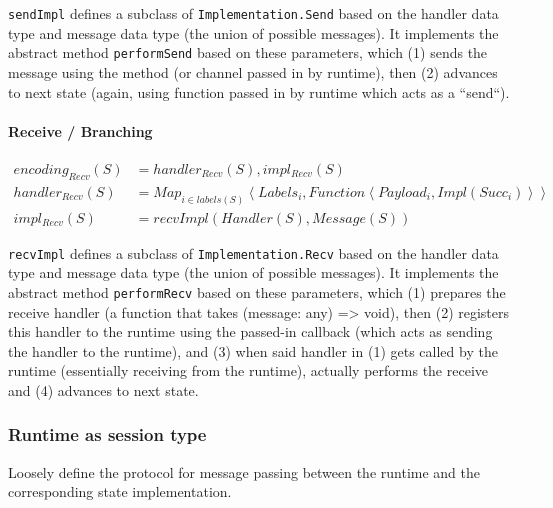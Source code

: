 \documentclass{article}
\begin{document}
\texttt{sendImpl} defines a subclass of \texttt{Implementation.Send} based on the handler data type
and message data type (the union of possible messages). It implements the abstract method
\texttt{performSend} based on these parameters, which (1) sends the message using
the method (or channel passed in by runtime), then (2) advances to next state (again, using
function passed in by runtime which acts as a ``send``).

\paragraph{Receive / Branching}

\begin{align}
encoding_{Recv}(S) &= handler_{Recv}(S), impl_{Recv}(S) \\
handler_{Recv}(S) &= Map_{i \in labels(S)}\left<Labels_i, Function\left<Payload_i, Impl(Succ_i)\right>\right> \\
impl_{Recv}(S) &= recvImpl(Handler(S), Message(S))
\end{align}

\texttt{recvImpl} defines a subclass of \texttt{Implementation.Recv} based on the handler data type
and message data type (the union of possible messages). It implements the abstract method
\texttt{performRecv} based on these parameters, which (1) prepares the receive handler (a function that takes
(message: any) => void), then (2) registers this handler to the runtime using the passed-in callback
(which acts as sending the handler to the runtime), and (3) when said handler in (1) gets called by the runtime
(essentially receiving from the runtime), actually performs the receive and (4) advances to next state.

\subsubsection{Runtime as session type}
Loosely define the protocol for message passing between the runtime and the
corresponding state implementation.
\end{document}
